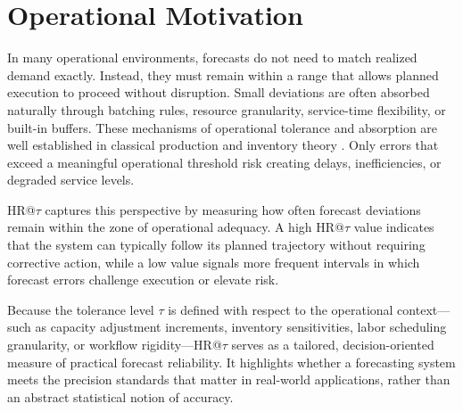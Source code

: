 \section{Operational Motivation}

In many operational environments, forecasts do not need to match realized demand
exactly. Instead, they must remain within a range that allows planned execution to
proceed without disruption. Small deviations are often absorbed naturally through
batching rules, resource granularity, service-time flexibility, or built-in
buffers. These mechanisms of operational tolerance and absorption are well
established in classical production and inventory theory
\citep{silver1998inventory}. Only errors that exceed a meaningful operational
threshold risk creating delays, inefficiencies, or degraded service levels.

HR@\(\tau\) captures this perspective by measuring how often forecast deviations
remain within the zone of operational adequacy. A high HR@\(\tau\) value indicates
that the system can typically follow its planned trajectory without requiring
corrective action, while a low value signals more frequent intervals in which
forecast errors challenge execution or elevate risk.

Because the tolerance level \(\tau\) is defined with respect to the operational
context—such as capacity adjustment increments, inventory sensitivities, labor
scheduling granularity, or workflow rigidity—HR@\(\tau\) serves as a tailored,
decision-oriented measure of practical forecast reliability. It highlights whether
a forecasting system meets the precision standards that matter in real-world
applications, rather than an abstract statistical notion of accuracy.
